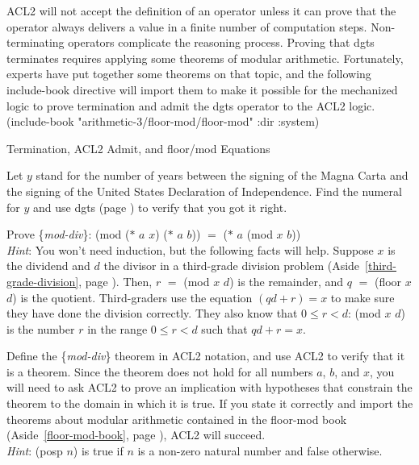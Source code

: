 \begin{aside}
ACL2 will not accept the definition of
an operator unless
it can prove that the operator always delivers a value in
a finite number of computation steps.
Non-terminating operators complicate the reasoning process.
Proving that \textsf{dgts} terminates
requires applying some theorems of modular arithmetic.
Fortunately, experts have put together some theorems on that topic,
and the following \textsf{include-book} directive will import them
to make it possible for the mechanized logic to prove termination
and admit the \textsf{dgts} operator to the ACL2 logic.\\
\hspace*{5mm}\textsf{(include-book "arithmetic-3/floor-mod/floor-mod" :dir :system)}
\caption{Termination, ACL2 Admit, and floor/mod Equations}
\label{admit-def}
\label{floor-mod-book}
\label{floor-mod-include-book}
\end{aside}

\begin{ExerciseList}
\Exercise Let $y$ stand for the number of years
between the signing of the Magna Carta and
the signing of the United States Declaration of Independence.
Find the numeral for $y$ and use \textsf{dgts} (page \pageref{dgts-defun})
to verify that you got it right.

\Exercise \label{modular-division}
Prove \{\emph{mod-div}\}:
\textsf{(mod ($*$ $a$ $x$) ($*$ $a$ $b$))} $=$ \textsf{($*$ $a$ (mod $x$ $b$))} \\
\emph{Hint}: You won't need induction, but the following facts will help.
Suppose $x$ is the dividend and $d$ the divisor
in a third-grade division problem
(Aside~\ref{third-grade-division}, page \pageref{third-grade-division}).
Then, $r$ $=$ \textsf{(mod $x$ $d$)} is the remainder,
and $q$ $=$ \textsf{(floor $x$ $d$)} is the quotient.
Third-graders use the equation $(qd + r) = x$
to make sure they have done the division correctly.
They also know that $0 \le r < d$:
\textsf{(mod $x$ $d$)} is the number $r$
in the range $0 \le r < d$ such that $qd + r = x$.

\Exercise \label{mod-div-defthm}Define
the \{\emph{mod-div}\} theorem
in ACL2 notation, and use ACL2 to verify that it is a theorem.
Since the theorem does not hold for all numbers $a$, $b$, and $x$,
you will need to ask ACL2 to prove an implication with
hypotheses that constrain the theorem to the domain in which it is true.
If you state it correctly and import the
theorems about modular arithmetic contained in the floor-mod book
(Aside~\ref{floor-mod-book}, page \pageref{floor-mod-book}),
ACL2 will succeed.\\
\emph{Hint}: \textsf{(posp $n$)} is true if $n$ is a non-zero natural number and false otherwise.
\end{ExerciseList}

